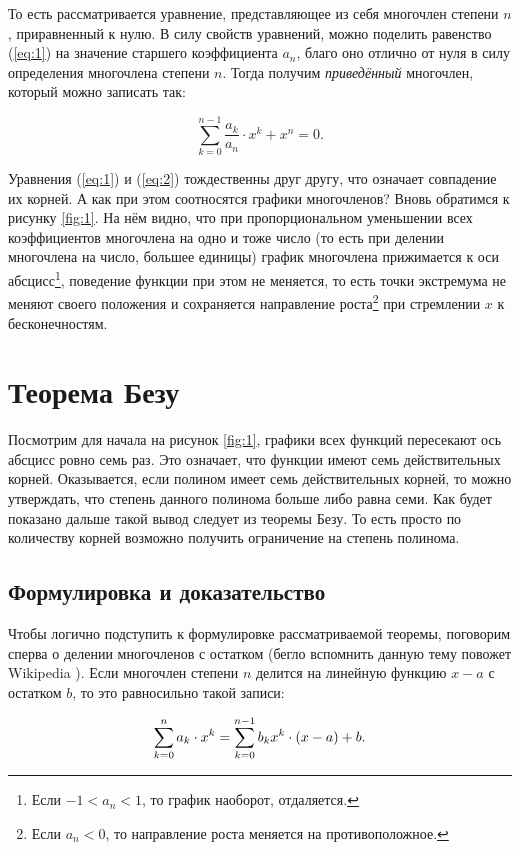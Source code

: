 \documentclass[12pt]{article}
\begin{document}
\noindent То есть рассматривается уравнение, представляющее из себя многочлен степени $n$, приравненный к нулю. В силу свойств уравнений, можно поделить равенство (\ref{eq:1}) на значение старшего коэффициента $a_n$, благо оно отлично от нуля в силу определения многочлена степени $n$. Тогда получим \emph{приведённый} многочлен, который можно записать так:

\begin{equation}\label{eq:2}
\sum_{k=0}^{n-1}{\dfrac{a_k}{a_n} \cdot x^k} + x^n = 0.
\end{equation}

\noindent Уравнения (\ref{eq:1}) и (\ref{eq:2}) тождественны друг другу, что означает совпадение их корней. А как при этом соотносятся графики многочленов? Вновь обратимся к рисунку \ref{fig:1}. На нём видно, что при пропорциональном уменьшении всех коэффициентов многочлена на одно и тоже число (то есть при делении многочлена на число, большее единицы) график многочлена прижимается к оси абсцисс\footnote{Если $-1<a_n<1$, то график наоборот, отдаляется.}, поведение функции при этом не меняется, то есть точки экстремума не меняют своего положения и сохраняется направление роста\footnote{Если $a_n<0$, то направление роста меняется на противоположное.} при стремлении $x$ к бесконечностям.

\section{Теорема Безу}
Посмотрим для начала на рисунок \ref{fig:1}, графики всех функций пересекают ось абсцисс ровно семь раз. Это означает, что функции имеют семь действительных корней. Оказывается, если полином имеет семь действительных корней, то можно утверждать, что степень данного полинома больше либо равна семи. Как будет показано дальше такой вывод следует из теоремы Безу. То есть просто по количеству корней возможно получить ограничение на степень полинома.

\subsection{Формулировка и доказательство}
Чтобы логично подступить к формулировке рассматриваемой теоремы, поговорим сперва о делении многочленов с остатком (бегло вспомнить данную тему повожет Wikipedia \cite{poly_div}). Если многочлен степени $n$ делится на линейную функцию $x-a$ с остатком $b$, то это равносильно такой записи:

\begin{equation}
\sum_{k=0}^n{a_k \cdot x^k} = \sum_{k=0}^{n-1}{b_k x^k}\cdot \qty(x-a) + b.
\label{eq:3}
\end{equation}
\end{document}
